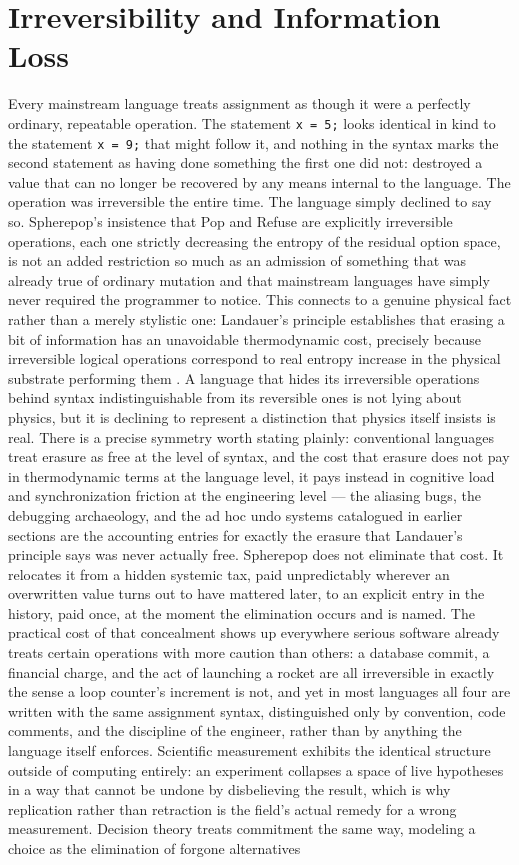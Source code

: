 \documentclass[11pt]{article}
\begin{document}
\section{Irreversibility and Information Loss}

Every mainstream language treats assignment as though it were a perfectly ordinary, repeatable operation. The statement \texttt{x = 5;} looks identical in kind to the statement \texttt{x = 9;} that might follow it, and nothing in the syntax marks the second statement as having done something the first one did not: destroyed a value that can no longer be recovered by any means internal to the language. The operation was irreversible the entire time. The language simply declined to say so. Spherepop's insistence that Pop and Refuse are explicitly irreversible operations, each one strictly decreasing the entropy of the residual option space, is not an added restriction so much as an admission of something that was already true of ordinary mutation and that mainstream languages have simply never required the programmer to notice. This connects to a genuine physical fact rather than a merely stylistic one: Landauer's principle establishes that erasing a bit of information has an unavoidable thermodynamic cost, precisely because irreversible logical operations correspond to real entropy increase in the physical substrate performing them \cite{landauer1961}. A language that hides its irreversible operations behind syntax indistinguishable from its reversible ones is not lying about physics, but it is declining to represent a distinction that physics itself insists is real. There is a precise symmetry worth stating plainly: conventional languages treat erasure as free at the level of syntax, and the cost that erasure does not pay in thermodynamic terms at the language level, it pays instead in cognitive load and synchronization friction at the engineering level --- the aliasing bugs, the debugging archaeology, and the ad hoc undo systems catalogued in earlier sections are the accounting entries for exactly the erasure that Landauer's principle says was never actually free. Spherepop does not eliminate that cost. It relocates it from a hidden systemic tax, paid unpredictably wherever an overwritten value turns out to have mattered later, to an explicit entry in the history, paid once, at the moment the elimination occurs and is named. The practical cost of that concealment shows up everywhere serious software already treats certain operations with more caution than others: a database commit, a financial charge, and the act of launching a rocket are all irreversible in exactly the sense a loop counter's increment is not, and yet in most languages all four are written with the same assignment syntax, distinguished only by convention, code comments, and the discipline of the engineer, rather than by anything the language itself enforces. Scientific measurement exhibits the identical structure outside of computing entirely: an experiment collapses a space of live hypotheses in a way that cannot be undone by disbelieving the result, which is why replication rather than retraction is the field's actual remedy for a wrong measurement. Decision theory treats commitment the same way, modeling a choice as the elimination of forgone alternatives 
\end{document}
